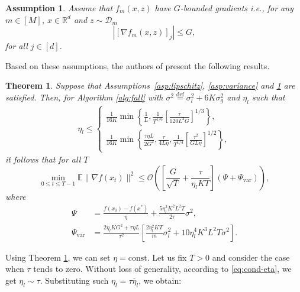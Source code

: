 \documentclass[sn-mathphys,Numbered]{sn-jnl}%
\newtheorem{theorem}{Theorem}
\newtheorem{assumption}{Assumption}
\newcommand*{\E}{{\mathbb E}}
\renewcommand{\|}{\parallel}
\newcommand{\D}{\mathcal{D}}
\newcommand{\eqdef}{\overset{\text{def}}{=}}
\renewcommand {\*} {\ast}
\begin{document}
\begin{assumption}
Assume that $f_m(x,z)$ have $G$-bounded gradients i.e., for any $m \in [M]$, $x \in \mathbb{R}^d$ and $z \sim \D_m$  
$$|[\nabla f_m(x,z)]_j| \leq G,$$  for all $j \in [d]$.
\label{asp:bounded-grad}
\end{assumption} 
Based on these assumptions, the authors of \cite{reddi2020adaptive} present the following results.
\begin{theorem}\label{thm:fadagrad_conv}
Suppose that Assumptions~\ref{asp:lipschitz}, \ref{asp:variance} and \ref{asp:bounded-grad} are satisfied. Then, for Algorithm \ref{alg:fall} with $\sigma^2 \eqdef \sigma_{l}^2 + 6K\sigma_{g}^2$ and $\eta_l$ such that
\begin{align}
\label{eq:cond-eta}
\eta_l \leq 
\begin{cases}
    \frac{1}{16K} \min \left\{\frac{1}{L}, \frac{1}{T^{1/6}} \left[\frac{\tau}{120L^2G} \right]^{1/3} \right\}, \\
    \frac{1}{16K} \min\left\{ \frac{\tau \eta L}{2G^2}, \frac{\tau}{4L\eta}, \frac{1}{T^{1/4}} \left[\frac{\tau^2}{GL\eta} \right]^{1/2} \right\},
\end{cases}
\end{align}
it follows that for all $T$ 
$$
\min_{0 \leq t \leq T-1} \E\|\nabla f(x_t)\|^2 \leq \mathcal{O}\left(\left[\frac{G}{\sqrt{T}} + \frac{\tau}{\eta_lKT}\right] \left( \Psi + {\Psi}_{\mathrm{var}} \right)\right),
$$
where
\begin{align*}
\Psi &= \frac{f(x_0) - f(x^*)}{\eta} +  \frac{5\eta_l^3K^2L^2T}{2\tau} \sigma^2,
\\
 {\Psi}_{\mathrm{var}} &=  \frac{2\eta_lKG^2 + \tau\eta L}{\tau^2} \left[ \frac{2\eta_l^2KT}{m} \sigma_{l}^2 + 10\eta_l^4K^3L^2T \sigma^2\right].
\end{align*}
\end{theorem}
Using Theorem \ref{thm:fadagrad_conv}, 
we can set $\eta = \text{const}$. 
Let us fix $T > 0$ and consider the case when $\tau$ tends to zero. 
Without loss of generality, 
according to \eqref{eq:cond-eta},
we get $\eta_l \sim \tau$. 
Substituting such $\eta_l = \tau \overline{\eta}_l$, we obtain:
\end{document}
